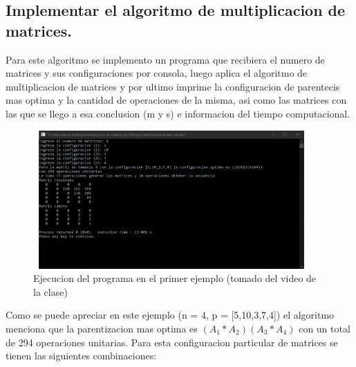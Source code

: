 \documentclass[spanish]{article}
\begin{document}
	\subsection{Implementar el algoritmo de multiplicacion de matrices.} 
	Para este algoritmo se implemento un programa que recibiera el numero de matrices y sus configuraciones por consola, luego aplica el algoritmo de multiplicacion de matrices y por ultimo imprime la configuracion de parentecis mas optima y la cantidad de operaciones de la misma, asi como las matrices con las que se llego a esa conclusion (m y s) e informacion del tiempo computacional.\\
	\begin{figure}[H]
		\centering
		\includegraphics[width=400px,height=200px]{captura17}
		\caption{Ejecucion del programa en el primer ejemplo (tomado del video de la clase)}
	\end{figure}
	Como se puede apreciar en este ejemplo (n = 4, p = [5,10,3,7,4]) el algoritmo menciona que la parentizacion mas optima es $(A_1*A_2)(A_3*A_4)$ con un total de 294 operaciones unitarias. Para esta configuracion particular de matrices se tienen las siguientes combinaciones:
\end{document}
